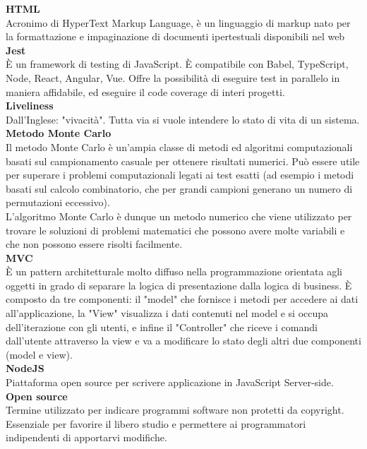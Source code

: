 \textbf{HTML}\-\\
Acronimo di HyperText Markup Language, è un linguaggio di markup nato per la formattazione e impaginazione di documenti ipertestuali disponibili nel web
\-\\

\textbf{Jest}\-\\
È un framework di testing di JavaScript. È compatibile con Babel, TypeScript, Node, React, Angular, Vue. Offre la possibilità di eseguire test in parallelo in maniera affidabile, ed eseguire il code coverage di interi progetti.
\-\\

\textbf{Liveliness}\-\\
Dall'Inglese: "vivacità". Tutta via si vuole intendere lo stato di vita di un sistema.
\-\\

\textbf{Metodo Monte Carlo}~\\
Il metodo Monte Carlo è un'ampia classe di metodi ed algoritmi computazionali basati sul campionamento casuale per ottenere risultati numerici. Può essere utile per superare i problemi computazionali legati ai test esatti (ad esempio i metodi basati sul calcolo combinatorio, che per grandi campioni generano un numero di permutazioni eccessivo).\\
L'algoritmo Monte Carlo è dunque un metodo numerico che viene utilizzato per trovare le soluzioni di problemi matematici che possono avere molte variabili e che non possono essere risolti facilmente.
~\\

\textbf{MVC}\-\\
È un pattern architetturale molto diffuso nella programmazione orientata agli oggetti in grado di separare la logica di presentazione dalla logica di business. È composto da
tre componenti: il "model" che fornisce i metodi per accedere ai dati all'applicazione, la "View" visualizza i dati contenuti nel model e si occupa dell'iterazione con gli
utenti, e infine il "Controller" che riceve i comandi dall'utente attraverso la view e va a modificare lo stato degli altri due componenti (model e view).
\-\\

\textbf{NodeJS}\-\\
Piattaforma open source per scrivere applicazione in JavaScript Server-side. 
\-\\

\textbf{Open source}\-\\
Termine utilizzato per indicare programmi software non protetti da copyright. Essenziale per favorire il libero studio e permettere ai programmatori indipendenti di apportarvi modifiche.
\-\\

